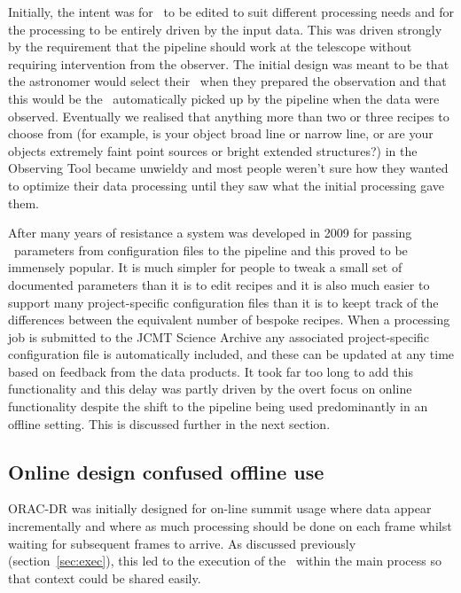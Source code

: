 \documentclass[final,authoryear,5p,times,twocolumn]{elsarticle}
\begin{document}
Initially, the intent was for \recipes\ to be edited to suit different
processing needs and for the processing to be entirely driven by the
input data. This was driven strongly by the requirement that the
pipeline should work at the telescope without requiring intervention
from the observer. The initial design was meant to be that the
astronomer would select their \recipe\ when they prepared the
observation and that this would be the \recipe\ automatically picked
up by the pipeline when the data were observed. Eventually we realised
that anything more than two or three recipes to choose from (for
example, is your object broad line or narrow line, or are your objects
extremely faint point sources or bright extended structures?) in the
Observing Tool became unwieldy and most people weren't sure how they
wanted to optimize their data processing until they saw what the
initial processing gave them.

After many years of resistance a system was developed in 2009 for
passing \recipe\ parameters from configuration files to the pipeline
and this proved to be immensely popular. It is much simpler for people
to tweak a small set of documented parameters than it is to edit
recipes and it is also much easier to support many project-specific
configuration files than it is to keept track of the differences
between the equivalent number of bespoke recipes. When a processing
job is submitted to the JCMT Science Archive any associated
project-specific configuration file is automatically included, and
these can be updated at any time based on feedback from the data
products. It took far too long to add this functionality and this
delay was partly driven by the overt focus on online functionality
despite the shift to the pipeline being used predominantly in an
offline setting. This is discussed further in the next section.

\subsection{Online design confused offline use}
\label{sec:onvoff}

ORAC-DR was initially designed for on-line summit usage where data
appear incrementally and where as much processing should be done on
each frame whilst waiting for subsequent frames to arrive. As
discussed previously (section~\ref{sec:exec}), this led to the
execution of the \recipe\ within the main process so that context
could be shared easily.
\end{document}
